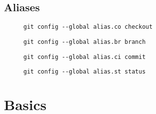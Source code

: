 \documentclass[french]{article}
\begin{document}
\subsection{Aliases}

\begin{description}
    \item[] \lstinline{git config --global alias.co checkout}
    \item[] \lstinline{git config --global alias.br branch}
    \item[] \lstinline{git config --global alias.ci commit}
    \item[] \lstinline{git config --global alias.st status}
\end{description}


\section{Basics}
\end{document}
